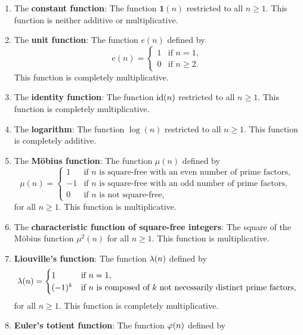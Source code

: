     \begin{enumerate}[label=(\roman*)]
      \item The \textbf{constant function}: The function $\mathbf{1}(n)$ restricted to all $n \ge 1$. This function is neither additive or multiplicative.
      \item The \textbf{unit function}: The function $e(n)$ defined by
      \[
        e(n) = \begin{cases} 1 & \text{if $n = 1$}, \\ 0 & \text{if $n \ge 2$}. \end{cases}
      \]
      This function is completely multiplicative.
      \item The \textbf{identity function}: The function $\operatorname{\textrm{id}}(n)$ restricted to all $n \ge 1$. This function is completely multiplicative.
      \item The \textbf{logarithm}: The function $\log(n)$ restricted to all $n \ge 1$. This function is completely additive.
      \item The \textbf{M\"obius function}: The function $\mu(n)$ defined by
      \[
        \mu(n) = \begin{cases} 1 & \text{if $n$ is square-free with an even number of prime factors}, \\ -1 & \text{if $n$ is square-free with an odd number of prime factors}, \\ 0 & \text{if $n$ is not square-free}, \end{cases}
      \]
      for all $n \ge 1$. This function is multiplicative.
      \item The \textbf{characteristic function of square-free integers}: The square of the M\"obius function $\mu^{2}(n)$ for all $n \ge 1$. This function is multiplicative.
      \item \textbf{Liouville's function}: The function $\lambda(n)$ defined by
      \[
        \lambda(n) = \begin{cases} 1 & \text{if $n = 1$}, \\ (-1)^{k} & \text{if $n$ is composed of $k$ not necessarily distinct prime factors}, \end{cases}
      \]
      for all $n \ge 1$. This function is completely multiplicative.
      \item \textbf{Euler's totient function}: The function $\varphi(n)$ defined by

\end{enumerate}

